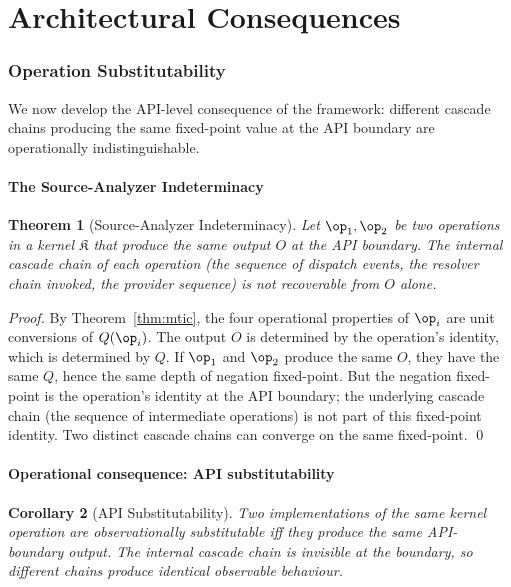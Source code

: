 \documentclass[twocolumn,11pt,a4paper]{article}
\newtheorem{theorem}{Theorem}[section]
\newtheorem{corollary}[theorem]{Corollary}
\newcommand{\Kernel}{\mathfrak{K}}
\newcommand{\Qweight}{Q}
\begin{document}
\part{Architectural Consequences}

\section{Operation Substitutability}
\label{sec:substitutability}

We now develop the API-level consequence of the framework: different cascade chains producing the same fixed-point value at the API boundary are operationally indistinguishable.

\subsection{The Source-Analyzer Indeterminacy}

\begin{theorem}[Source-Analyzer Indeterminacy]
\label{thm:indeterminacy}
Let $\op_1, \op_2$ be two operations in a kernel $\Kernel$ that produce the same output $O$ at the API boundary. The internal cascade chain of each operation (the sequence of dispatch events, the resolver chain invoked, the provider sequence) is not recoverable from $O$ alone.
\end{theorem}

\begin{proof}
By Theorem~\ref{thm:mtic}, the four operational properties of $\op_i$ are unit conversions of $\Qweight(\op_i)$. The output $O$ is determined by the operation's identity, which is determined by $\Qweight$. If $\op_1$ and $\op_2$ produce the same $O$, they have the same $\Qweight$, hence the same depth of negation fixed-point. But the negation fixed-point is the operation's identity at the API boundary; the underlying cascade chain (the sequence of intermediate operations) is not part of this fixed-point identity. Two distinct cascade chains can converge on the same fixed-point. \qed
\end{proof}

\subsection{Operational consequence: API substitutability}

\begin{corollary}[API Substitutability]
\label{cor:substitutability}
Two implementations of the same kernel operation are observationally substitutable iff they produce the same API-boundary output. The internal cascade chain is invisible at the boundary, so different chains produce identical observable behaviour.
\end{corollary}
\end{document}
